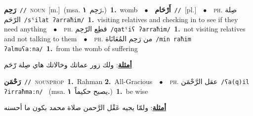 \documentclass[10pt,a4paper,twoside]{article} %
\begin{document}
\begin{multicols}{2}
{\setlength\topsep{0pt}\textbf{\foreignlanguage{arabic}{رَحِم}}\ {\color{gray}\texttt{//}\color{black}}\ \textsc{noun}\ [m.]\ \color{gray}(msa. \foreignlanguage{arabic}{رَحِم}~\foreignlanguage{arabic}{\textbf{١.}})\color{black}\ \textbf{1.}~womb\ \ $\bullet$\ \ \setlength\topsep{0pt}\textbf{\foreignlanguage{arabic}{أَرْحَام}}\ {\color{gray}\texttt{//}\color{black}}\ [pl.]\ \ $\bullet$\ \ \textsc{ph.} \color{gray} \foreignlanguage{arabic}{صِلة الرّحَم}\color{black}\ {\color{gray}\texttt{/{\sffamily sˤilat ʔarraħim}/}\color{black}}\ \textbf{1.}~visiting relatives and checking in to see if they need anything\ \ $\bullet$\ \ \textsc{ph.} \color{gray} \foreignlanguage{arabic}{قطِع الرّحِم}\color{black}\ {\color{gray}\texttt{/{\sffamily qatˤiʕ ʔarraħim}/}\color{black}}\ \textbf{1.}~not visiting relatives and not talking to them\ \ $\bullet$\ \ \textsc{ph.} \color{gray} \foreignlanguage{arabic}{من رَحِم المُعَانَاة}\color{black}\ {\color{gray}\texttt{/{\sffamily min raħim ʔalmuʕaːna}/}\color{black}}\ \textbf{1.}~from the womb of suffering\  \begin{flushright}\color{gray}\foreignlanguage{arabic}{\textbf{\underline{\foreignlanguage{arabic}{أمثلة}}}: ولك زور عماتك وخالاتك هاي صِلة رّحَم}\end{flushright}\color{black}} \vspace{2mm}

{\setlength\topsep{0pt}\textbf{\foreignlanguage{arabic}{رَحْمَن}}\ {\color{gray}\texttt{//}\color{black}}\ \textsc{noun\textunderscore prop}\ \textbf{1.}~Rahman  \textbf{2.}~All-Gracious\ \ $\bullet$\ \ \textsc{ph.} \color{gray} \foreignlanguage{arabic}{عقل الرَّحْمَن}\color{black}\ {\color{gray}\texttt{/{\sffamily ʕa(q)il ʔirraħmaːn}/}\color{black}}\ \color{gray} (msa. \foreignlanguage{arabic}{يصبح حكيماً}~\foreignlanguage{arabic}{\textbf{١.}})\color{black}\ \textbf{1.}~be wise\  \begin{flushright}\color{gray}\foreignlanguage{arabic}{\textbf{\underline{\foreignlanguage{arabic}{أمثلة}}}: ولمّا يجيه عَقْل الرَّحمن صلاة محمد بكون ما أحسنه}\end{flushright}\color{black}} \vspace{2mm}


\end{multicols}
\end{document}

